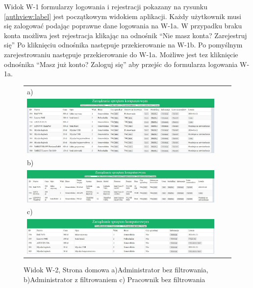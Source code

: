 Widok W-1 formularzy logowania i rejestracji pokazany na rysunku \ref{authview:label} jest początkowym widokiem aplikacji. Każdy użytkownik musi się zalogować podając poprawne dane logowania na W-1a. W przypadku braku konta możliwa jest rejestracja klikając na odnośnik "`Nie masz konta? Zarejestruj się"' Po kliknięciu odnośnika następuje przekierowanie na W-1b. Po pomyślnym zarejestrowaniu następuje przekierowanie do W-1a. Możliwe jest tez kliknięcie odnośnika "`Masz już konto? Zaloguj się"' aby przejśc do formularza logowania W-1a.



\begin{figure}[htb]
  \centering
	\begin{tabular}{@{}lll@{}}
	a)\\
  \includegraphics[width=\textwidth]{rys05/view/alldevices.pdf} \\
	
	b)\\
	\includegraphics[width=\textwidth]{rys05/view/compGrun.pdf} \\
	c) \\
	\includegraphics[width=\textwidth]{rys05/view/pracownikHome.pdf}
	\end{tabular}
  \caption{Widok W-2, Strona domowa a)Administrator bez filtrowania, b)Administrator z filtrowaniem c) Pracownik bez filtrowania}
  \label{home:label}
\end{figure}


